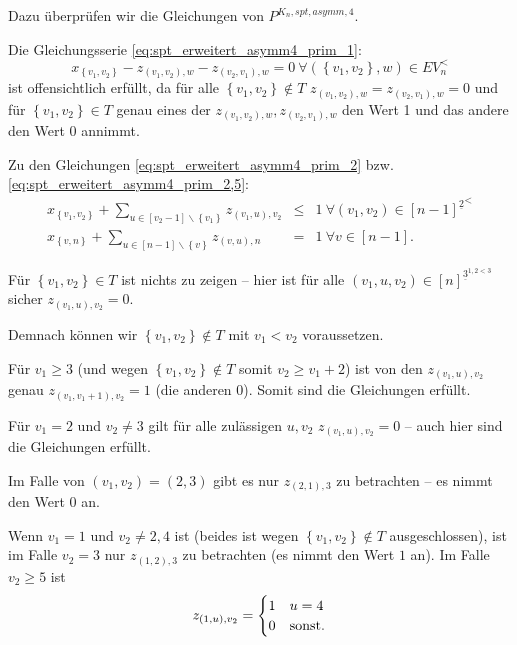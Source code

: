 \documentclass[10p,a4paper,BCOR = 12mm, DIV=15]{scrbook}
\begin{document}
\begin{bew}
Dazu überprüfen wir die Gleichungen von $P^{K_n, spt, asymm, 4}$.

Die Gleichungsserie \eqref{eq:spt_erweitert_asymm4_prim_1}:
\begin{displaymath}
x_{\left\{v_1, v_2\right\}} - z_{\left(v_1, v_2\right), w} - z_{\left(v_2, v_1\right), w} = 0\ \forall \left(\left\{v_1, v_2\right\}, w\right)\in EV_n^< 
\end{displaymath}
ist offensichtlich erfüllt, da für alle $\left\{v_1, v_2\right\} \notin T$ $z_{\left(v_1, v_2\right), w} = z_{\left(v_2, v_1\right), w} = 0$ und für $\left\{v_1, v_2\right\} \in T$ genau eines der $z_{\left(v_1, v_2\right), w}, z_{\left(v_2, v_1\right), w}$ den Wert 1 und das andere den Wert 0 annimmt.

Zu den Gleichungen \eqref{eq:spt_erweitert_asymm4_prim_2} bzw. \eqref{eq:spt_erweitert_asymm4_prim_2,5}:
\begin{eqnarray*}
x_{\left\{v_1, v_2\right\}} + \sum_{u\in[v_2-1]\backslash\left\{v_1\right\}} z_{\left(v_1, u\right), v_2} & \leq & 1\ \forall \left(v_1, v_2\right)\in {[n-1]^{\underline{2}}}^< \\
x_{\left\{v, n\right\}} + \sum_{u\in[n-1]\backslash\left\{v\right\}} z_{\left(v, u\right), n} & = & 1\ \forall v \in [n-1].
\end{eqnarray*}

Für $\left\{v_1, v_2\right\} \in T$ ist nichts zu zeigen -- hier ist für alle $\left(v_1, u, v_2\right) \in \left[n\right]^{\underline{3}^{1, 2 < 3}}$ sicher $z_{\left(v_1, u\right), v_2} = 0$.

Demnach können wir $\left\{v_1, v_2\right\} \notin T$ mit $v_1 < v_2$ voraussetzen.

Für $v_1 \geq 3$ (und wegen $\left\{v_1, v_2\right\} \notin T$ somit $v_2 \geq v_1 + 2$) ist von den $z_{\left(v_1, u\right), v_2}$ genau  $z_{\left(v_1, v_1 + 1\right), v_2} = 1$ (die anderen 0). Somit sind die Gleichungen erfüllt.

Für $v_1 = 2$ und $v_2 \neq 3$ gilt für alle zulässigen $u, v_2$  $z_{\left(v_1, u\right), v_2} = 0$ -- auch hier sind die Gleichungen erfüllt.

Im Falle von $\left(v_1, v_2\right) = \left(2, 3\right)$ gibt es nur $z_{\left(2, 1\right), 3}$ zu betrachten -- es nimmt den Wert $0$ an.

Wenn $v_1 = 1$ und $v_2 \neq 2, 4$ ist (beides ist wegen $\left\{v_1, v_2\right\} \notin T$ ausgeschlossen), ist im Falle $v_2 = 3$ nur $z_{\left(1, 2\right), 3}$ zu betrachten (es nimmt den Wert $1$ an). Im Falle $v_2 \geq 5$ ist
\begin{displaymath}
z_{\left(1, u\right), v_2} = \begin{cases}
1 & u=4 \\
0 & \textnormal{sonst}.
\end{cases}
\end{displaymath}
\end{bew}
\end{document}

